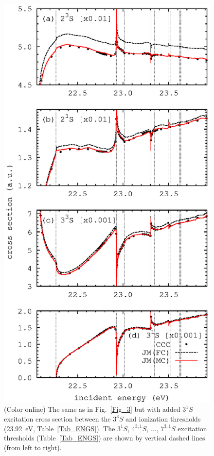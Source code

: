 \documentclass[aip
, pra
, showpacs
, aps
, twocolumn
, groupedaddress
, floatfix
]{revtex4}
\begin{document}
\begin{figure}[htb]
\includegraphics[scale=1]{fig4.ps}
\caption{(Color online)
The same as in Fig.~\ref{Fig_3} but with added $3^1S$ excitation cross section
between the $3^3S$ and ionization thresholds (23.92~eV, Table~\ref{Tab_ENGS}).
The $3^1S$, $4^{3,1}S$, ..., $7^{3,1}S$ excitation thresholds (Table~\ref{Tab_ENGS})
are shown by vertical dashed lines (from left to right).
}
\label{Fig_4}
\end{figure}
\end{document}
